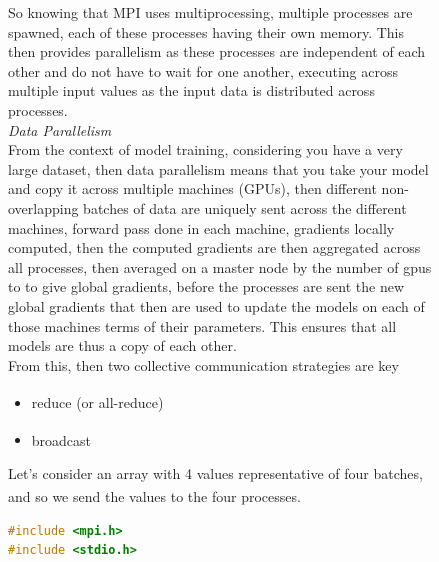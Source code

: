 \documentclass[12pt]{article}
\newcommand{\customtext}[3]{%
    \vspace{#2} %
    \fontsize{13}{8}\textcolor{#1}{\textit{#3}}%
}
\newcommand{\sidecite}[1]{\textsuperscript{\textcolor{blue}{\textbf{\scriptsize#1}}}}
\newcommand{\maincitecount}{\sidecite{\stepcounter{maincite}\themaincite}}
\begin{document}
\begin{figure}[!htb]
    \begin{minipage}[t]{0.65\textwidth}
    \raggedright
    So knowing that MPI uses multiprocessing, multiple processes are spawned, each of these processes 
    having their own memory. This then provides parallelism as these processes are independent of each 
    other and do not have to wait for one another, executing across multiple input values as the input 
    data is distributed across processes.\\
    \vspace{1em}
    \customtext{xtitle}{0em}{Data Parallelism}\\
    From the context of model training, considering you have a very large dataset, then 
    data parallelism means that you take your model and copy it across multiple machines (GPUs),
    then different non-overlapping batches of data are uniquely sent across the different 
    machines, forward pass done in each machine, gradients locally computed, then the 
    computed gradients are then aggregated across all processes, then averaged on a master node 
    by the number of gpus to to give global gradients, before the processes are sent the new 
    global gradients that then are used to update the models on each of those machines terms 
    of their parameters. This ensures that all models are thus a copy of each other.\\
    From this, then two collective  communication strategies are key 
    \begin{itemize}[left=0pt,topsep=0pt,itemsep=0ex,parsep=0ex]
        \item reduce (or all-reduce) \maincitecount
        \item broadcast \maincitecount
    \end{itemize}
    Let's consider an array with 4 values representative of four batches, and so 
    we send the values to the four processes\maincitecount.
\begin{lstlisting}[language=c,style=c,basicstyle=\ttfamily\footnotesize]
#include <mpi.h>
#include <stdio.h>


\end{lstlisting}
\end{minipage}
\end{figure}
\end{document}
